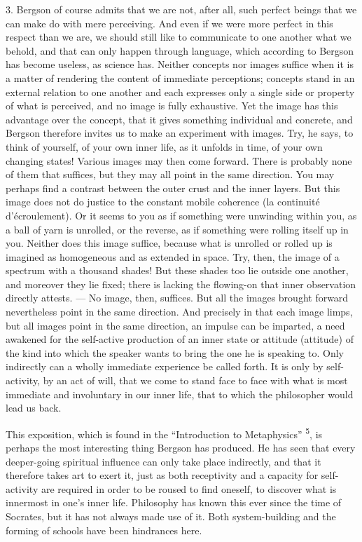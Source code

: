\documentclass[12pt,a4paper,openany]{book}
\newcommand{\opage}[1]{\marginnote{\footnotesize\textit{[#1]}}}
\newcommand{\nm}[1]{\unskip\textsuperscript{#1}}
\begin{document}
3. Bergson of course admits that we are not, after all, such perfect beings that we can make do with mere perceiving. And even if we were more perfect in this respect than we are, we should still like to communicate to one another what we behold, and that can only happen through language, which according to Bergson has become useless, as science has. Neither concepts nor images suffice when it is a matter of rendering the content of immediate perceptions; concepts stand in an external relation to one another and each expresses only a single side or property of what is perceived, and no image is fully exhaustive. Yet the image has this advantage over the concept, that it gives something individual and concrete, and Bergson therefore invites us to make an experiment with images. Try, he says, to think of yourself, of your own inner life, as it unfolds in time, of your own changing states! Various images may then come forward. There is probably none of them that suffices, but they may all point in the same direction. You may perhaps find a contrast between the outer crust and the inner layers. But this image does not do justice to the constant mobile coherence (la continuité d'écroulement). Or it seems to you as if something were unwinding within you, as a ball of yarn
\opage{7}is unrolled, or the reverse, as if something were rolling itself up in you. Neither does this image suffice, because what is unrolled or rolled up is imagined as homogeneous and as extended in space. Try, then, the image of a spectrum with a thousand shades! But these shades too lie outside one another, and moreover they lie fixed; there is lacking the flowing-on that inner observation directly attests. --- No image, then, suffices. But all the images brought forward nevertheless point in the same direction. And precisely in that each image limps, but all images point in the same direction, an impulse can be imparted, a need awakened for the self-active production of an inner state or attitude (attitude) of the kind into which the speaker wants to bring the one he is speaking to. Only indirectly can a wholly immediate experience be called forth. It is only by self-activity, by an act of will, that we come to stand face to face with what is most immediate and involuntary in our inner life, that to which the philosopher would lead us back.

This exposition, %
which is found in the ``Introduction to Metaphysics'' \nm{5}, is perhaps the most interesting thing Bergson has produced. He has seen that every deeper-going spiritual influence can only take place indirectly, and that it therefore takes art to exert it, just as both receptivity and a capacity for self-activity are required in order to be roused to find oneself, to discover what is innermost in one's inner life. Philosophy has known this ever since the time of Socrates, but it has not always made use of it. Both system-building and the forming of schools have been hindrances here.
\end{document}
